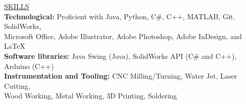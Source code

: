 \documentclass{article}
\begin{document}
\underline{\Large S\normalsize KILLS\qquad\qquad\qquad\qquad\qquad\qquad\qquad\qquad\qquad\qquad\qquad\qquad\qquad\qquad\qquad\qquad\qquad\qquad\qquad\qquad\qquad\qquad\quad}\\
\large\textbf{Technological:} Proficient with Java, Python, C\#, C++, MATLAB, Git, SolidWorks, \\\qquad Microsoft Office, Adobe Illustrator, Adobe Photoshop, Adobe InDesign, and \LaTeX\\
\large\textbf{Software libraries:} Java Swing (Java), SolidWorks API (C\# and C++), Arduino (C++)\\
\large\textbf{Instrumentation and Tooling:} CNC Milling/Turning, Water Jet, Laser Cutting,\\\qquad Wood Working, Metal Working, 3D Printing, Soldering\\
\end{document}
